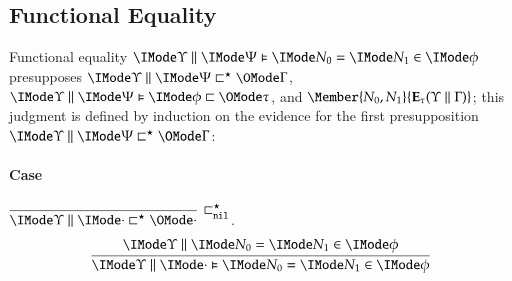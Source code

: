 \documentclass[11pt]{article}
\theoremstyle{definition}
\theoremstyle{remark}
\numberwithin{equation}{section}
\newcommand\Exprs{\mathbf{E}}
\begin{document}
\subsection{Functional Equality}

Functional equality $\FRMemEq{\Upsilon}{\Psi}{N_0}{N_1}{\phi}$ presupposes
$\RefinesCtx{\Upsilon}{\Psi}{\Gamma}$, $\FRefines{\Upsilon}{\Psi}{\phi}{\tau}$,
and $\Member{N_0,N_1}{\Exprs_\tau(\Upsilon\parallel\Gamma)}$; this judgment is defined by
induction on the evidence for the first presupposition
$\RefinesCtx{\Upsilon}{\Psi}{\Gamma}$:


\paragraph{Case} $\DefRefinesCtxNil{\Upsilon}$.
\[
  \infer{
    \FRMemEq{\Upsilon}{\cdot}{N_0}{N_1}{\phi}
  }{
    \RMemEq{\Upsilon}{N_0}{N_1}{\phi}
  }
\]
\end{document}
